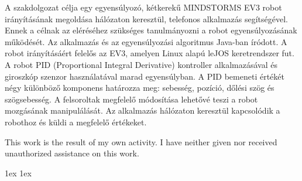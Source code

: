 \documentclass[final]{ubb_dolgozat}
\author{
Márton Zete-Örs
}
\begin{document}
\begin{abstractEN}
	
A szakdolgozat célja egy egyensúlyozó, kétkerekű MINDSTORMS EV3 robot irányításának megoldása hálózaton keresztül, telefonos alkalmazás segítségével. Ennek a célnak az eléréséhez szükséges tanulmányozni a robot egyensúlyozásának működését. Az alkalmazás és az egyensúlyozási algoritmus Java-ban íródott. A robot irányításáért felelős az EV3, amelyen Linux alapú leJOS keretrendszer fut. A robot PID (Proportional Integral Derivative) kontroller alkalmazásával és giroszkóp szenzor használatával marad egyensúlyban. A PID bemeneti értékét négy különböző komponens határozza meg: sebesség, pozíció, dőlési szög és szögsebesség. A felsoroltak megfelelő módosítása lehetővé teszi a robot mozgásának manipulálását. Az alkalmazás hálózaton keresztül kapcsolódik a robothoz és küldi a megfelelő értékeket.

This work is the result of my own activity. I have neither given nor received unauthorized assistance on this work.

\end{abstractEN}

\maketitle

{ \baselineskip 1ex
  \parskip 1ex
  \tableofcontents
}















{ \renewcommand{\baselinestretch}{0.8}\normalsize %
  \setlength{\itemsep}{-2.4mm}
  \setlength{\bibspacing}{0.67\baselineskip}
  
  
}
\end{document}
